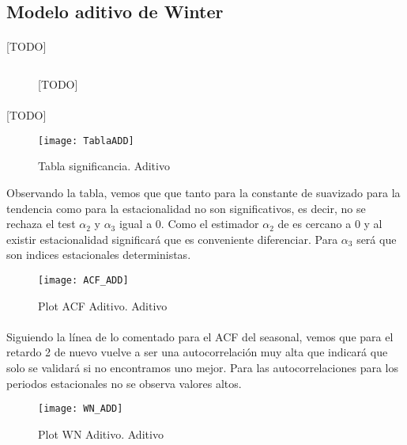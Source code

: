 \documentclass[a4paper, spanish]{article}
\begin{document}
    \subsection{Modelo aditivo de Winter}

      \paragraph{}
      [TODO]

      \begin{figure}[h]
        \centering
        \inputminted{SAS}{./res/code/b-01-esm-2.sas}
        \caption{[TODO]}
        \label{code:b_esm_2}
      \end{figure}

      \paragraph{}
      [TODO]

      \begin{figure}[h]
        \centering
        \texttt{[image: TablaADD]}
        \caption{Tabla significancia. Aditivo}
        \label{}
      \end{figure}

      Observando la tabla, vemos que que tanto para la constante de suavizado para la tendencia como para la estacionalidad no son significativos, es decir, no se rechaza el test $\alpha_2$ y $\alpha_3$ igual a 0. Como el estimador $\alpha_2$ de es cercano a 0 y al existir estacionalidad significará que es conveniente diferenciar. Para $\alpha_3$ será que son indices estacionales deterministas.

      \begin{figure}[h]
        \centering
        \texttt{[image: ACF\_ADD]}
        \caption{Plot ACF Aditivo. Aditivo}
        \label{}
      \end{figure}

      \paragraph{}
      Siguiendo la línea de lo comentado para el ACF del seasonal, vemos que para el retardo 2 de nuevo vuelve a ser una autocorrelación muy alta que indicará que solo se validará si no encontramos uno mejor. Para las autocorrelaciones para los periodos estacionales no se observa valores altos.

      \begin{figure}[h]
        \centering
        \texttt{[image: WN\_ADD]}
        \caption{Plot WN Aditivo. Aditivo}
        \label{}
      \end{figure}
\end{document}
